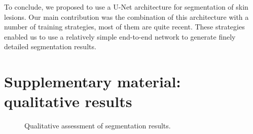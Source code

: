 \documentclass{article}
\begin{document}
To conclude, we proposed to use a U-Net architecture for
segmentation of skin lesions. Our main contribution was the
combination of this architecture with a number of
training strategies, most of them are quite recent. These strategies
enabled us to use a relatively simple end-to-end network to generate
finely detailed segmentation results.

\medskip

\small



\clearpage
\section{Supplementary material: qualitative results}
\begin{figure}[hbt]
\centering
{}\hfil
{}
\caption{Qualitative assessment of segmentation results.}\label{result_samples}
\end{figure}
\end{document}
